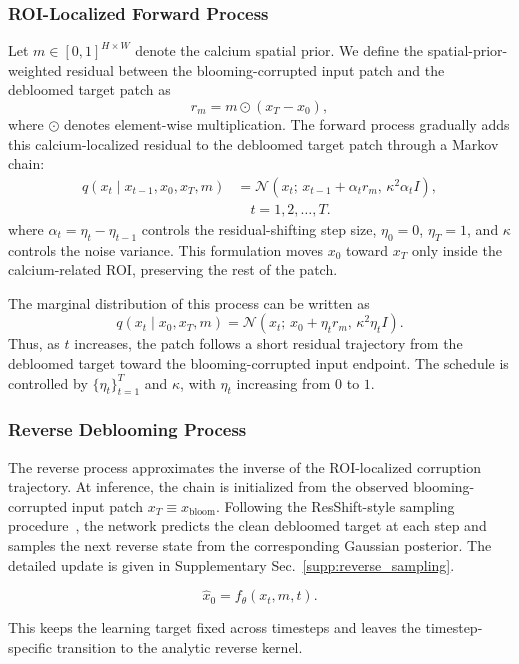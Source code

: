 \documentclass[singleLetter,times]{sagej}
\begin{document}
\subsubsection{ROI-Localized Forward Process}

Let $m \in [0,1]^{H \times W}$ denote the calcium spatial prior. We define the spatial-prior-weighted residual between the blooming-corrupted input patch and the debloomed target patch as
\[
r_m = m \odot (x_T - x_0),
\]
where $\odot$ denotes element-wise multiplication. The forward process gradually adds this calcium-localized residual to the debloomed target patch through a Markov chain:
\[
\begin{aligned}
q(x_t \mid x_{t-1}, x_0, x_T, m)
&=
\mathcal{N}\!\left(
x_t;\,
x_{t-1}+\alpha_t r_m,\,
\kappa^2 \alpha_t I
\right),\\
&\quad t=1,2,\ldots,T .
\end{aligned}
\]
where $\alpha_t=\eta_t-\eta_{t-1}$ controls the residual-shifting step size, $\eta_0=0$, $\eta_T=1$, and $\kappa$ controls the noise variance. This formulation moves $x_0$ toward $x_T$ only inside the calcium-related ROI, preserving the rest of the patch.

The marginal distribution of this process can be written as
\[
q(x_t \mid x_0, x_T, m)
=
\mathcal{N}\!\left(
x_t;\,
x_0+\eta_t r_m,\,
\kappa^2 \eta_t I
\right).
\]
Thus, as $t$ increases, the patch follows a short residual trajectory from the debloomed target toward the blooming-corrupted input endpoint. The schedule is controlled by $\{\eta_t\}_{t=1}^{T}$ and $\kappa$, with $\eta_t$ increasing from $0$ to $1$.



\subsubsection{Reverse Deblooming Process}

The reverse process approximates the inverse of the ROI-localized corruption trajectory. At inference, the chain is initialized from the observed blooming-corrupted input patch $x_T \equiv x_{\mathrm{bloom}}$. Following the ResShift-style sampling procedure~\cite{resshift}, the network predicts the clean debloomed target at each step and samples the next reverse state from the corresponding Gaussian posterior. The detailed update is given in Supplementary Sec.~\ref{supp:reverse_sampling}.

\[
\hat{x}_0
=
f_{\theta}(x_t, m, t).
\]

This keeps the learning target fixed across timesteps and leaves the timestep-specific transition to the analytic reverse kernel.
\end{document}
